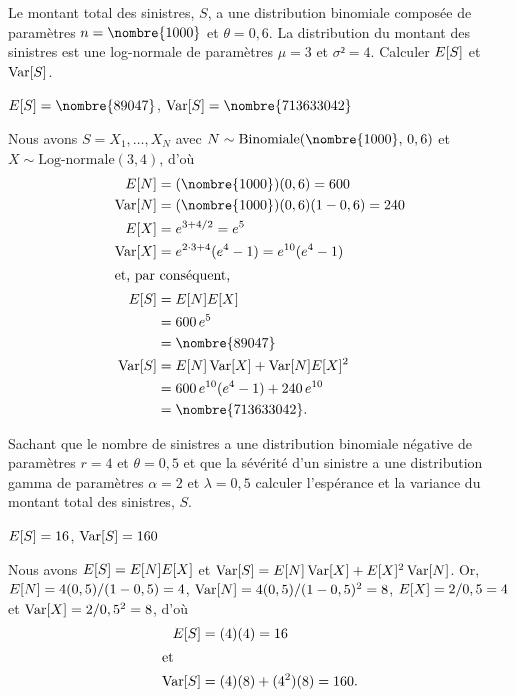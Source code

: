 \begin{exercice}
  Le montant total des sinistres, $S$, a une distribution binomiale
  composée de paramètres $n = \nombre{1000}$ et $\theta = 0,6$. La
  distribution du montant des sinistres est une log-normale de
  paramètres $\mu = 3$ et $\sigma² = 4$. Calculer $E [ S ]$ et
  $\operatorname{Var} [ S ]$.
  \begin{rep}
    $\esp{S} = \nombre{89047}$, $\var{S} = \nombre{713633042}$
  \end{rep}
  \begin{sol}
    Nous avons $S = X_1, \dots, X_N$ avec
    $N \sim \text{Binomiale}(\nombre{1000},\, 0,6)$ et
    $X \sim \text{Log-normale}(3, 4)$, d'où
    \begin{align*}
      \esp{N} &= (\nombre{1000})(0,6) = 600 \\
      \var{N} &= (\nombre{1000})(0,6)(1 - 0,6) = 240 \\
      \esp{X} &= e^{3 + 4/2} = e^5 \\
      \var{X} &= e^{2 \cdot 3 + 4}(e^4 - 1) = e^{10}(e^4 - 1) \\
      \intertext{et, par conséquent,}
      \esp{S}
      &= \esp{N} \esp{X} \\
      &= 600\, e^5 \\
      &= \nombre{89047} \\
      \var{S}
      &= \esp{N} \var{X} + \var{N} \esp{X}^2 \\
      &= 600\, e^{10}(e^4 - 1) + 240\, e^{10} \\
      &= \nombre{713633042}.
    \end{align*}
  \end{sol}
\end{exercice}

\begin{exercice}
  Sachant que le nombre de sinistres a une distribution binomiale
  négative de paramètres $r = 4$ et $\theta = 0,5$ et que la sévérité
  d'un sinistre a une distribution gamma de paramètres $\alpha = 2$ et
  $\lambda = 0,5$ calculer l'espérance et la variance du montant total
  des sinistres, $S$.
  \begin{rep}
    $E [ S ] = 16$, $\operatorname{Var} [ S ] = 160$
  \end{rep}
  \begin{sol}
    Nous avons $E [ S ] = E [ N ]E [ X ]$ et $\operatorname{Var} [ S ] = E [ N ]\operatorname{Var} [ X ] +
    E [ X ]^2\operatorname{Var} [ N ]$. Or, $E [ N ] = 4 (0,5)/(1 - 0,5) = 4$, $\operatorname{Var} [ N ]
    = 4 (0,5)/(1 - 0,5)^2 = 8$, $E [ X ] = 2/0,5 = 4$ et $\operatorname{Var} [ X ] =
    2/0,5^2 = 8$, d'où
    \begin{align*}
        E [ S ]
        &= (4)(4)
         = 16 \\
        \intertext{et}
        \operatorname{Var} [ S ]
        &= (4)(8) + (4^2)(8)
         = 160.
    \end{align*}
  \end{sol}
\end{exercice}

